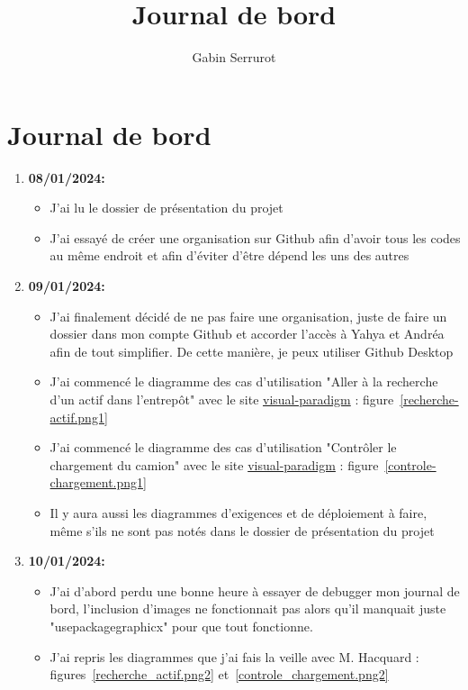 \documentclass[10pt,a4paper]{article}
\title{Journal de bord}
\author{Gabin Serrurot}
\begin{document}
\maketitle

\section{Journal de bord}

\begin{enumerate}
    \item \textbf{08/01/2024:}
        \begin{itemize}
            \item J'ai lu le dossier de présentation du projet
            \item J'ai essayé de créer une organisation sur Github afin d'avoir tous les codes au même endroit et afin d'éviter d'être dépend les uns des autres
        \end{itemize}
    \item \textbf{09/01/2024:}
        \begin{itemize}
            \item J'ai finalement décidé de ne pas faire une organisation, juste de faire un dossier dans mon compte Github et accorder l'accès à Yahya et Andréa afin de tout simplifier. De cette manière, je peux utiliser Github Desktop
            \item J'ai commencé le diagramme des cas d'utilisation "Aller à la recherche d’un actif dans l’entrepôt" avec le site \href{https://online.visual-paradigm.com}{visual-paradigm} : figure~\ref{recherche-actif.png1}
            \item J'ai commencé le diagramme des cas d'utilisation "Contrôler le chargement du camion" avec le site \href{https://online.visual-paradigm.com}{visual-paradigm} : figure~\ref{controle-chargement.png1}
            \item Il y aura aussi les diagrammes d'exigences et de déploiement à faire, même s'ils ne sont pas notés dans le dossier de présentation du projet
        \end{itemize}
    \item \textbf{10/01/2024:}
        \begin{itemize}
            \item J'ai d'abord perdu une bonne heure à essayer de debugger mon journal de bord, l'inclusion d'images ne fonctionnait pas alors qu'il manquait juste "usepackage{graphicx}" pour que tout fonctionne.
            \item J'ai repris les diagrammes que j'ai fais la veille avec M. Hacquard : figures~\ref{recherche_actif.png2} et~\ref{controle_chargement.png2} 

\end{itemize}
\end{enumerate}
\end{document}
